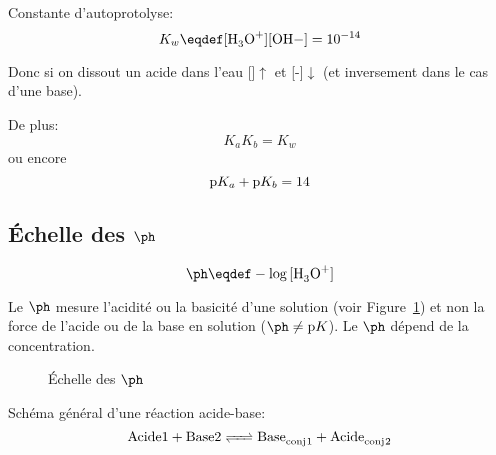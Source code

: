 Constante d'autoprotolyse:
\[ K_w\eqdef[\ce{H3O+}][\ce{OH}-]=10^{-14} \]

Donc si on dissout un acide dans l'eau []$\uparrow$ et [-]$\downarrow$ (et inversement dans le cas d'une base).

De plus:
\[ K_aK_b=K_w \]
ou encore
\[ \mathrm{p}K_a+\mathrm{p}K_b=14 \]

\subsection{\'Echelle des $\ph$}

$$\ph\eqdef-\log{[\ce{H3O+}]}$$

Le $\ph$ mesure l'acidité ou la basicité d'une solution (voir Figure~\ref{fig:ph_scale}) et non la force de l'acide ou de la base en solution ($\ph \neq \mathrm{p}K$).
Le $\ph$ dépend de la concentration.
\begin{figure}[ht!]
  \begin{center}
  \end{center}
  \caption{Échelle des $\ph$}
  \label{fig:ph_scale}
\end{figure}

Schéma général d'une réaction acide-base:
\[ \ce{Acide 1 + Base 2 <=> Base_{conj}1 + Acide_{conj}2} \]

